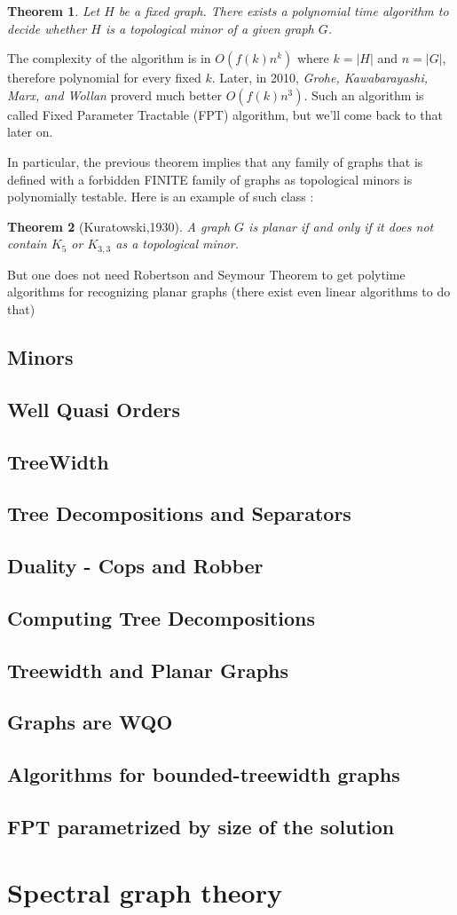 \documentclass[12pt,a4paper]{article}
\newtheorem{theorem}{Theorem}
\begin{document}
\begin{theorem}
Let $H$ be a fixed graph. There exists a polynomial time algorithm to decide whether $H$ is a topological minor of a given graph $G$.
\end{theorem}

The complexity of the algorithm is in $O(f(k)n^k)$ where $k=|H|$ and $n=|G|$, therefore polynomial for every fixed $k$. Later, in 2010, \textit{Grohe, Kawabarayashi, Marx, and Wollan} proverd much better $O(f(k)n^3)$. Such an algorithm is called Fixed Parameter Tractable (FPT) algorithm, but we'll come back to that later on.

In particular, the previous theorem implies that any family of graphs that is defined with a forbidden FINITE family of graphs as topological minors is polynomially testable. Here is an example of such class :

\begin{theorem}[Kuratowski,1930]
A graph $G$ is planar if and only if it does not contain $K_5$ or $K_{3,3}$ as a topological minor.
\end{theorem}

But one does not need Robertson and Seymour Theorem to get polytime algorithms for recognizing planar graphs (there exist even linear algorithms to do that)

\subsection{Minors}
\subsection{Well Quasi Orders}
\subsection{TreeWidth}
\subsection{Tree Decompositions and Separators}
\subsection{Duality - Cops and Robber}
\subsection{Computing Tree Decompositions}
\subsection{Treewidth and Planar Graphs}
\subsection{Graphs are WQO}
\subsection{Algorithms for bounded-treewidth graphs}
\subsection{FPT parametrized by size of the solution}

\section{Spectral graph theory}
\end{document}
